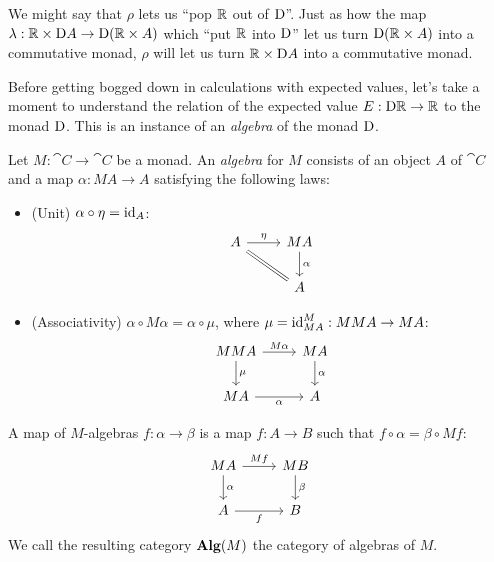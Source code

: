 \documentclass[DynamicalBook]{subfiles}
\begin{document}
We might say that $\rho$ lets us ``pop $\mathbb{R}$ out of $\mathrm{D}$''. Just as how
the map $\lambda : \mathbb{R} \times \mathrm{D} A \to \mathrm{D}(\mathbb{R} \times A)$ which
``put $\mathbb{R}$ into $\mathrm{D}$'' let us turn $\mathrm{D}(\mathbb{R} \times A)$ into a
commutative monad, $\rho$ will let us turn $\mathbb{R} \times \mathrm{D} A$ into a
commutative monad.

Before getting bogged down in calculations with expected values, let's take a
moment to understand the relation of the expected value $E : \mathrm{D} \mathbb{R} \to
\mathbb{R}$ to the monad $\mathrm{D}$. This is an instance of an \emph{algebra} of the
monad $\mathrm{D}$.

\begin{definition}
  Let $M : \cat{C} \to \cat{C}$ be a monad. An \emph{algebra} for $M$ consists
  of an object $A$ of $\cat{C}$ and a map $\alpha : M A \to A$ satisfying the
  following laws:
  \begin{itemize}
  \item (Unit) $\alpha \circ \eta = \mathrm{id}_A$:
    \[
      \begin{tikzcd}
        A \ar[r, "\eta"] \ar[dr, equals] & M A \ar[d, "\alpha"] \\
        & A
      \end{tikzcd}
    \]
    \item (Associativity) $\alpha \circ M\alpha = \alpha \circ \mu$, where $\mu
      = \mathrm{id}^{M}_{MA} : M M A \to M A$:
      \[
        \begin{tikzcd}
          MM A \ar[d, "\mu"] \ar[r, "M\alpha"] & M A \ar[d, "\alpha"] \\
          M A \ar[r, "\alpha"'] & A
        \end{tikzcd}
      \]
  \end{itemize}

  A map of $M$-algebras $f : \alpha \to \beta$ is a map $f : A \to B$ such that
  $f \circ \alpha = \beta \circ M f$:
  \[
        \begin{tikzcd}
          M A \ar[d, "\alpha"] \ar[r, "Mf"] & M B \ar[d, "\beta"] \\
           A \ar[r, "f"'] & B 
        \end{tikzcd}
      \]
  We call the resulting category $\textbf{Alg}(M)$ the category of algebras of $M$.
\end{definition}
\end{document}
